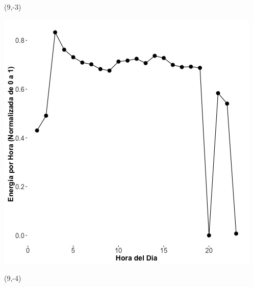 \documentclass{article}\usepackage[]{graphicx}\usepackage[]{color}
\newenvironment{knitrout}{}{} %
\begin{document}
\begin{textblock}{1}(9,-3)
\begin{minipage}{20em}
\begingroup

\endgroup
\end{minipage}
\end{textblock}

 \vspace{2cm}

\begin{knitrout}
\color{fgcolor}
\includegraphics[scale=0.75]{figure/A1_fplot_norm_median} 
\end{knitrout}


 \begin{textblock}{1}(9,-4)
\begin{minipage}{20em}
\begingroup

\endgroup
\end{minipage}
\end{textblock}

 \vspace{2cm}
\end{document}
